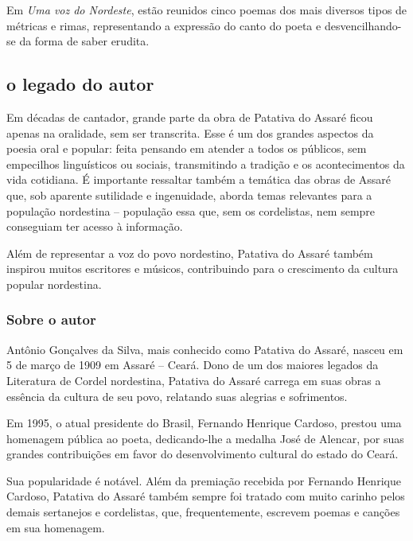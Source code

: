 \documentclass[12pt]{extarticle}
\begin{document}
Em \emph{Uma voz do Nordeste}, estão reunidos cinco poemas dos mais
diversos tipos de métricas e rimas, representando a expressão do canto
do poeta e desvencilhando-se da forma de saber erudita.

\subsection{o legado do autor}

Em décadas de cantador, grande parte da obra de Patativa do Assaré ficou
apenas na oralidade, sem ser transcrita. Esse é um dos grandes aspectos
da poesia oral e popular: feita pensando em atender a todos os públicos,
sem empecilhos linguísticos ou sociais, transmitindo a tradição e os
acontecimentos da vida cotidiana. É importante ressaltar também a
temática das obras de Assaré que, sob aparente sutilidade e ingenuidade,
aborda temas relevantes para a população nordestina -- população essa
que, sem os cordelistas, nem sempre conseguiam ter acesso à informação.

Além de representar a voz do povo nordestino, Patativa do Assaré também
inspirou muitos escritores e músicos, contribuindo para o crescimento da
cultura popular nordestina.

\subsubsection{{Sobre o autor}}

Antônio Gonçalves da Silva, mais conhecido como Patativa do Assaré,
nasceu em 5 de março de 1909 em Assaré -- Ceará. Dono de um dos maiores
legados da Literatura de Cordel nordestina, Patativa do Assaré carrega
em suas obras a essência da cultura de seu povo, relatando suas alegrias
e sofrimentos.


Em 1995, o atual presidente do Brasil, Fernando Henrique Cardoso,
prestou uma homenagem pública ao poeta, dedicando-lhe a medalha José de
Alencar, por suas grandes contribuições em favor do desenvolvimento
cultural do estado do Ceará.

Sua popularidade é notável. Além da premiação recebida por Fernando
Henrique Cardoso, Patativa do Assaré também sempre foi tratado com muito
carinho pelos demais sertanejos e cordelistas, que, frequentemente,
escrevem poemas e canções em sua homenagem.
\end{document}
